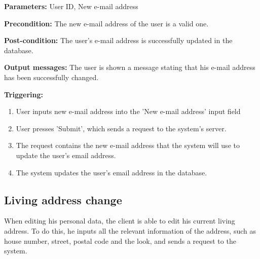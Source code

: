  \begin{description}

\item \textbf{Parameters:} User ID, New e-mail address

\item \textbf{Precondition:} The new e-mail address of the user is a valid one.

\item \textbf{Post-condition:} The user's e-mail address is successfully updated
in the database.

\item \textbf{Output messages:} The user is shown a message stating that his
e-mail address has been successfully changed.

\item \textbf{Triggering:}
\begin{enumerate}
\item User inputs new e-mail address into the 'New e-mail address' input field

\item User presses 'Submit', which sends a request to the system's server.

\item The request contains the new e-mail address that the system will use to
update the user's email address.

\item The system updates the user's email address in the database.

\end{enumerate}

\end{description}

\subsection{Living address change}

 When editing his personal data, the client is able to edit his current living
 address.
 To do this, he inputs all the relevant information of the address, such as
 house number, street, postal code and the look, and sends a request to the
 system.
 

